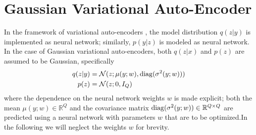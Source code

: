 \section{Gaussian Variational Auto-Encoder}
\label{sec:shape-prior-gaussian-vae}

In the framework of variational auto-encoders
\cite{KingmaWelling:2013}, the model
distribution $q(z|y)$ is implemented as neural network; similarly,
$p(y|z)$ is modeled as neural network.
In the case of Gaussian variational auto-encoders,
both $q(z|x)$ and $p(z)$ are assumed to be Gaussian, specifically
\begin{align}
  q(z|y) &= \mathcal{N}(z; \mu(y;w), \mathrm{diag}(\sigma^2(y;w)))\label{eq:recognition-model}\\
  p(z) &= \mathcal{N}(z; 0, I_Q)\label{eq:prior-model}
\end{align}
where the dependence on the neural network weights $w$
is made explicit; \ie both the mean $\mu(y;w) \in \mathbb{R}^Q$
and the covariance matrix
$\mathrm{diag}(\sigma^2(y;w)) \in\mathbb{R}^{Q \times Q}$
are predicted using a neural network with parameters $w$ that
are to be optimized.In the following we will neglect the weights $w$
for brevity.

